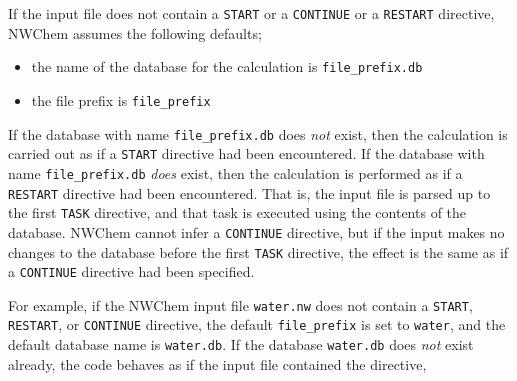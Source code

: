

If the input file does not contain a \verb+START+ or a \verb+CONTINUE+ or a
\verb+RESTART+ directive, NWChem assumes the following defaults;

\begin{itemize}
  \item the name of the database for the calculation is {\tt file\_prefix.db}
  \item the file prefix is {\tt file\_prefix}
\end{itemize}

If the database 
with name {\tt file\_prefix.db} does {\it not} exist, then the calculation 
is carried out as if a \verb+START+ directive had been encountered.  
If the database with name {\tt file\_prefix.db} {\it does} exist, then 
the calculation
is performed as if a \verb+RESTART+ directive had been encountered.  That is,
the input file is parsed up to the first \verb+TASK+ directive, and that
task is executed using the contents of the database.  NWChem cannot infer
a \verb+CONTINUE+ directive, but if the input makes no changes to the 
database before the first \verb+TASK+ directive, the effect is the same as 
if a \verb+CONTINUE+ directive had been specified.


For example, if the NWChem input file \verb+water.nw+ does not contain
a \verb+START+, \verb+RESTART+, or \verb+CONTINUE+ directive, the default
{\tt file\_prefix} is set to {\tt water}, and the default database name is
{\tt water.db}.  If the database \verb+water.db+ does {\it not} exist already,
the code behaves as if the input file contained the directive,

